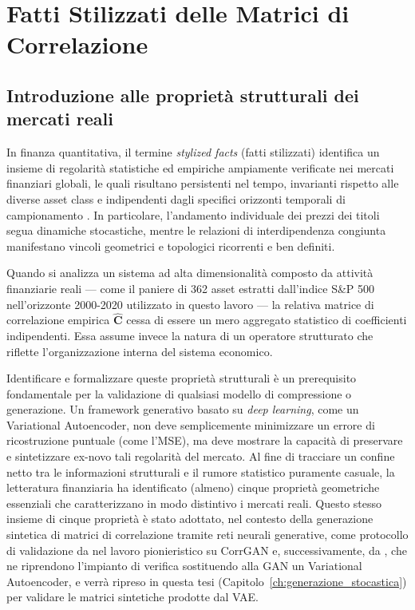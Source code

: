 \chapter{Fatti Stilizzati delle Matrici di Correlazione}
\label{ch:stylized_facts}

\section{Introduzione alle proprietà strutturali dei mercati reali}
\label{sec:intro_proprieta}

In finanza quantitativa, il termine \emph{stylized facts} (fatti stilizzati) identifica un insieme di regolarità statistiche ed empiriche ampiamente verificate nei mercati finanziari globali, le quali risultano persistenti nel tempo, invarianti rispetto alle diverse asset class e indipendenti dagli specifici orizzonti temporali di campionamento \citep{cont2001stylizedfacts}. In particolare, l'andamento individuale dei prezzi dei titoli segua dinamiche stocastiche, mentre le relazioni di interdipendenza congiunta manifestano vincoli geometrici e topologici ricorrenti e ben definiti.

Quando si analizza un sistema ad alta dimensionalità composto da attività finanziarie reali --- come il paniere di 362 asset estratti dall'indice S\&P 500 nell'orizzonte 2000-2020 utilizzato in questo lavoro --- la relativa matrice di correlazione empirica $\hat{\mathbf{C}}$ cessa di essere un mero aggregato statistico di coefficienti indipendenti. Essa assume invece la natura di un operatore strutturato che riflette l'organizzazione interna del sistema economico.

Identificare e formalizzare queste proprietà strutturali è un prerequisito fondamentale per la validazione di qualsiasi modello di compressione o generazione. Un framework generativo basato su \emph{deep learning}, come un Variational Autoencoder, non deve semplicemente minimizzare un errore di ricostruzione puntuale (come l'MSE), ma deve mostrare la capacità di preservare e sintetizzare ex-novo tali regolarità del mercato. Al fine di tracciare un confine netto tra le informazioni strutturali e il rumore statistico puramente casuale, la letteratura finanziaria ha identificato (almeno) cinque proprietà geometriche essenziali che caratterizzano in modo distintivo i mercati reali. Questo stesso insieme di cinque proprietà è stato adottato, nel contesto della generazione sintetica di matrici di correlazione tramite reti neurali generative, come protocollo di validazione da \citet{marti2019corrgan} nel lavoro pionieristico su CorrGAN e, successivamente, da \citet{caprioli2024ptfvae}, che ne riprendono l'impianto di verifica sostituendo alla GAN un Variational Autoencoder, e verrà ripreso in questa tesi (Capitolo~\ref{ch:generazione_stocastica}) per validare le matrici sintetiche prodotte dal VAE.

